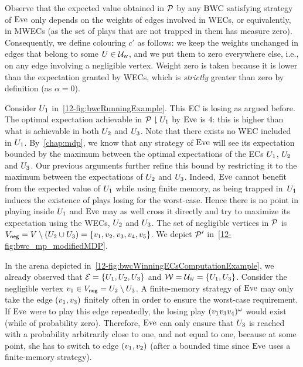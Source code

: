 Observe that the expected value obtained in ${\mathcal{P}}$ by any $\text{BWC}$ satisfying strategy of $\text{Eve}$ only depends on the weights of edges involved in WECs, or equivalently, in MWECs (as the set of plays that are not trapped in them has measure zero). Consequently, we define colouring $c'$ as follows: we keep the weights unchanged in edges that belong to some $U \in \mathcal{U}_{\textsc{w}}$, and we put them to zero everywhere else, i.e., on any edge involving a negligible vertex. Weight zero is taken because it is lower than the expectation granted by WECs, which is \textit{strictly} greater than zero by definition (as $\alpha = 0$).

\begin{example}
Consider $U_{1}$ in~\cref{12-fig:bwcRunningExample}. This EC is losing as argued before. The optimal expectation achievable in ${\mathcal{P}} \downharpoonright U_{1}$ by $\text{Eve}$ is $4$: this is higher than what is achievable in both $U_{2}$ and $U_{3}$. Note that there exists no WEC included in $U_{1}$. By~\cref{chap:mdp}, we know that any strategy of $\text{Eve}$ will see its expectation bounded by the maximum between the optimal expectations of the ECs $U_{1}$, $U_{2}$ and $U_{3}$. Our previous arguments further refine this bound by restricting it to the maximum between the expectations of $U_{2}$ and $U_{3}$. Indeed, $\text{Eve}$ cannot benefit from the expected value of $U_{1}$ while using finite memory, as being trapped in~$U_{1}$ induces the existence of plays losing for the worst-case. Hence there is no point in playing inside $U_{1}$ and $\text{Eve}$ may as well cross it directly and try to maximize its expectation using the WECs, $U_{2}$ and $U_{3}$. The set of negligible vertices in ${\mathcal{P}}$ is $V_{{\sf neg}} = V \setminus (U_{2} \cup U_{3}) = \{v_{1}, v_{2}, v_{3}, v_{4}, v_{5}\}$. We depict ${\mathcal{P}}'$ in~\cref{12-fig:bwc_mp_modifiedMDP}.

In the arena depicted in~\cref{12-fig:bwcWinningECsComputationExample}, we already observed that $\mathcal{E} = \{U_{1}, U_{2}, U_{3}\}$ and $\mathcal{W} = \mathcal{U}_{\textsc{w}} = \{U_{1}, U_{3}\}$. Consider the negligible vertex $v_{1} \in V_{{\sf neg}} = U_{2} \setminus U_{3}$. A finite-memory strategy of $\text{Eve}$ may only take the edge $(v_{1}, v_{3})$ finitely often in order to ensure the worst-case requirement. If $\text{Eve}$ were to play this edge repeatedly, the losing play $(v_{1}v_{3}v_{4})^{\omega}$ would exist (while of probability zero). Therefore, $\text{Eve}$ can only ensure that $U_{3}$ is reached with a probability arbitrarily close to one, and not equal to one, because at some point, she has to switch to edge $(v_{1}, v_{2})$ (after a bounded time since $\text{Eve}$ uses a finite-memory strategy).
\end{example}

